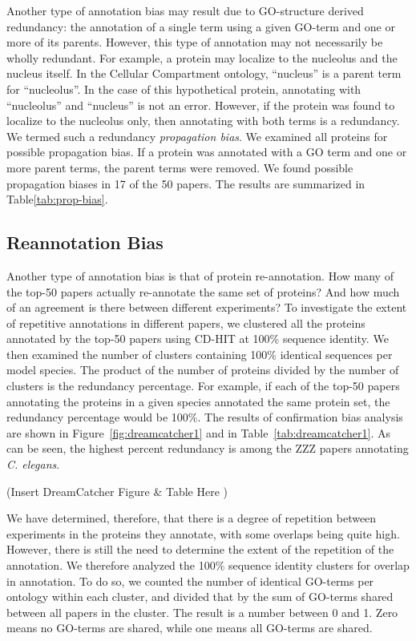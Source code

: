 \documentclass[12pt]{article}
\begin{document}
Another type of annotation bias may result due to GO-structure derived redundancy: the annotation of
a single term using a given GO-term and one or more of its parents. However, this type of
annotation may not necessarily be wholly redundant. For example, a protein may localize to
the nucleolus and the nucleus itself. In the Cellular Compartment ontology, ``nucleus'' is
a parent term for ``nucleolus''. In the case of this hypothetical protein, annotating with
``nucleolus'' and ``nucleus'' is not an error. However, if the protein was found to
localize to the nucleolus only, then annotating with both terms is a redundancy. We termed
such a redundancy \textit{propagation bias}. We examined all proteins for possible propagation
bias. If a protein was annotated with a GO term and one or more parent terms, the parent
terms were removed. We found possible propagation biases in 17 of the 50 papers. The results
are summarized in Table\ref{tab:prop-bias}. 

\subsection*{Reannotation Bias}

Another type of annotation bias is that of protein re-annotation. How many of the top-50 papers
actually re-annotate the same set of proteins? And how much of an agreement is there between different
experiments?
To investigate the extent of repetitive annotations in different papers, we clustered all the
proteins annotated by the top-50 papers using CD-HIT\cite{CD_HIT} at 100\% sequence identity. We
then examined the number of clusters containing 100\% identical sequences per model species. The
product of the number of proteins divided by the number of clusters is the redundancy
percentage. For example, if each of the top-50 papers annotating the proteins in a given species
annotated the same protein set, the redundancy percentage would be 100\%. The results of
confirmation bias analysis are shown in Figure~\ref{fig:dreamcatcher1} and in
Table~\ref{tab:dreamcatcher1}. As can be seen, the highest percent redundancy is among the ZZZ
papers annotating {\em C. elegans}. 

(Insert DreamCatcher Figure \& Table Here )

We have determined, therefore, that there is a degree of repetition between experiments in
the proteins they annotate, with some overlaps being quite high. However, there is still the
need to determine the extent of the repetition of the annotation. We therefore analyzed the
100\% sequence identity clusters for overlap in annotation.  To do so, we counted the number
of identical GO-terms per ontology within each cluster, and divided that by the sum of
GO-terms shared between all papers in the cluster. The result is a number between 0 and 1.
Zero means no GO-terms are shared, while one means all GO-terms are shared. 
\end{document}
